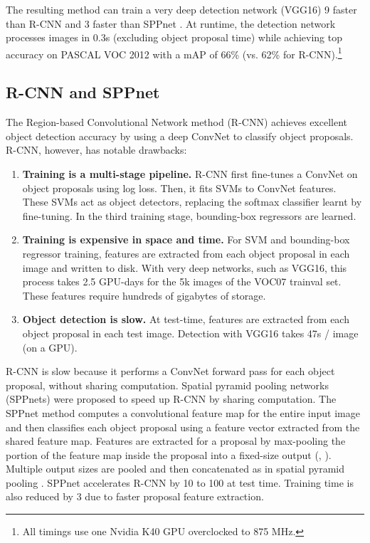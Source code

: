 \documentclass[10pt,twocolumn,letterpaper]{article}
\newcommand{\X}{\xspace}
\newcommand{\vggsixteen}{VGG16\xspace}
\begin{document}
The resulting method can train a very deep detection network (\vggsixteen \cite{simonyan2015verydeep}) 9\X faster than R-CNN \cite{girshick2014rcnn} and 3\X faster than SPPnet \cite{he2014spp}.
At runtime, the detection network processes images in 0.3s (excluding object proposal time) while achieving top accuracy on PASCAL VOC 2012 \cite{Pascal-IJCV} with a mAP of 66\% (vs. 62\% for R-CNN).\footnote{All timings use one Nvidia K40 GPU overclocked to 875 MHz.}



\subsection{R-CNN and SPPnet}
The Region-based Convolutional Network method (R-CNN) \cite{girshick2014rcnn} achieves excellent object detection accuracy by using a deep ConvNet to classify object proposals.
R-CNN, however, has notable drawbacks:
\begin{enumerate}
\itemsep0em
\item {\bf Training is a multi-stage pipeline.}
R-CNN first fine-tunes a ConvNet on object proposals using log loss.
Then, it fits SVMs to ConvNet features.
These SVMs act as object detectors, replacing the softmax classifier learnt by fine-tuning.
In the third training stage, bounding-box regressors are learned.
\item {\bf Training is expensive in space and time.}
For SVM and bounding-box regressor training, features are extracted from each object proposal in each image and written to disk.
With very deep networks, such as \vggsixteen, this process takes 2.5 GPU-days for the 5k images of the VOC07 trainval set.
These features require hundreds of gigabytes of storage.
\item {\bf Object detection is slow.}
At test-time, features are extracted from each object proposal in each test image.
Detection with \vggsixteen takes 47s / image (on a GPU).
\end{enumerate}

R-CNN is slow because it performs a ConvNet forward pass for each object proposal, without sharing computation.
Spatial pyramid pooling networks (SPPnets) \cite{he2014spp} were proposed to speed up R-CNN by sharing computation.
The SPPnet method computes a convolutional feature map for the entire input image and then classifies each object proposal using a feature vector extracted from the shared feature map.
Features are extracted for a proposal by max-pooling the portion of the feature map inside the proposal into a fixed-size output (\eg, ).
Multiple output sizes are pooled and then concatenated as in spatial pyramid pooling \cite{Lazebnik2006}.
SPPnet accelerates R-CNN by 10 to 100\X at test time.
Training time is also reduced by 3\X due to faster proposal feature extraction.
\end{document}
